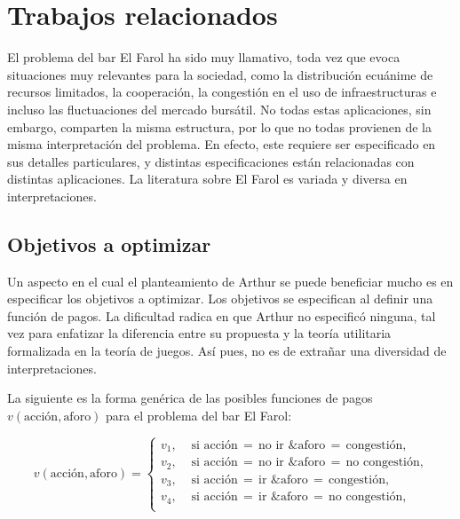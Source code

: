 \documentclass[11pt]{amsart}
\begin{document}
\section{Trabajos relacionados}\label{sec:trab-rel}

El problema del bar El Farol ha sido muy llamativo, toda vez que evoca situaciones muy relevantes para la sociedad, como la distribución ecuánime de recursos limitados, la cooperación, la congestión en el uso de infraestructuras e incluso las fluctuaciones del mercado bursátil. No todas estas aplicaciones, sin embargo, comparten la misma estructura, por lo que no todas provienen de la misma interpretación del problema. En efecto, este requiere ser especificado en sus detalles particulares, y distintas especificaciones están relacionadas con distintas aplicaciones. La literatura sobre El Farol es variada y diversa en interpretaciones. 

\subsection{Objetivos a optimizar}
Un aspecto en el cual el planteamiento de Arthur se puede beneficiar mucho es en especificar los objetivos a optimizar. Los objetivos se especifican al definir una función de pagos. La dificultad radica en que Arthur no especificó ninguna, tal vez para enfatizar la diferencia entre su propuesta y la teoría utilitaria formalizada en la teoría de juegos. Así pues, no es de extrañar una diversidad de interpretaciones. 

La siguiente es la forma genérica de las posibles funciones de pagos $v(\mbox{acción},\mbox{aforo})$ para el problema del bar El Farol:

\vspace{-.5\baselineskip}

\[
v(\mbox{acción},\mbox{aforo}) = \begin{cases}
v_1, & \mbox{ si  acción$\,{=}\,$no ir \& aforo$\,{=}\,$congestión,}\\
v_2, & \mbox{ si  acción$\,{=}\,$no ir \& aforo$\,{=}\,$no congestión,}\\
v_3, & \mbox{ si  acción$\,{=}\,$ir \& aforo$\,{=}\,$congestión,}\\
v_4, & \mbox{ si  acción$\,{=}\,$ir \& aforo$\,{=}\,$no congestión,}\\
\end{cases}
\]

\vspace{.5\baselineskip}
\end{document}
